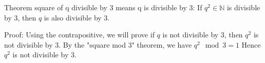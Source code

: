 Theorem square of q divisible by 3 means q is divisible by 3:
If $q^2 \in \mathbb{N}$ is divisible by $3$, then $q$ is also divisible by $3$.


Proof:
Using the contrapositive, we will prove if $q$ is not divisible by $3$, then $q^2$ is not divisible by $3$.
By the "square mod 3" theorem, we have $q^2 \mod 3 = 1$
Hence $q^2$ is not divisible by $3$.